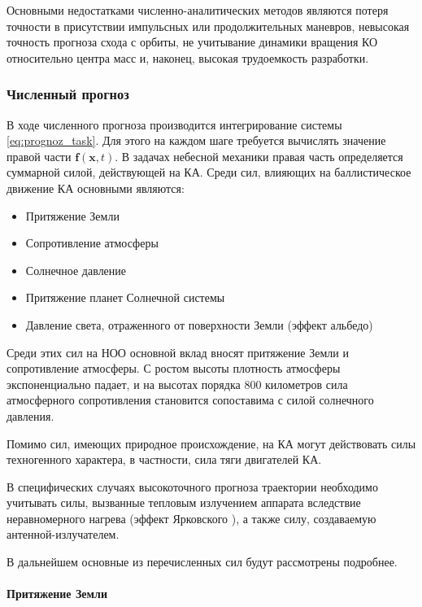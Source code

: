 Основными недостатками численно-аналитических методов являются 
потеря точности в присутствии импульсных или продолжительных маневров,
невысокая точность прогноза схода с орбиты,
не учитывание динамики вращения КО относительно центра масс и, наконец,
высокая трудоемкость разработки.

\subsubsection{Численный прогноз}

В ходе численного прогноза производится интегрирование системы \eqref{eq:prognoz_task}.
Для этого на каждом шаге требуется вычислять значение правой части $\mathbf{f}(\mathbf{x}, t)$. 
В задачах небесной механики правая часть определяется суммарной силой, действующей на КА.
Среди сил, влияющих на баллистическое движение КА основными являются:
\begin{itemize}
    \item Притяжение Земли
    \item Сопротивление атмосферы
    \item Солнечное давление
    \item Притяжение планет Солнечной системы
    \item Давление света, отраженного от поверхности Земли (эффект альбедо)
\end{itemize}

Среди этих сил на НОО основной вклад вносят притяжение Земли и сопротивление атмосферы.
С ростом высоты плотность атмосферы экспоненциально падает, и на высотах порядка 800 километров
сила атмосферного сопротивления становится сопоставима с силой солнечного давления.

Помимо сил, имеющих природное происхождение, на КА могут действовать силы техногенного характера, 
в частности, сила тяги двигателей КА.

В специфических случаях высокоточного прогноза траектории необходимо учитывать
силы, вызванные тепловым излучением аппарата вследствие неравномерного нагрева (эффект Ярковского \cite{farinella1996}), 
а также силу, создаваемую антенной-излучателем.

В дальнейшем основные из перечисленных сил будут рассмотрены подробнее.

\paragraph{Притяжение Земли} \mbox{} \\

